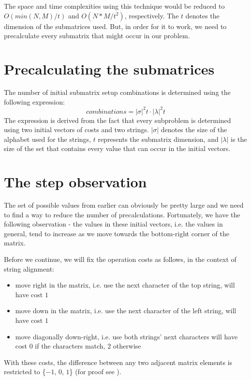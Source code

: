 \documentclass[times, utf8, seminar, numeric]{fer}
\begin{document}
The space and time complexities using this technique would be reduced to \\
$O(min(N, M) / t)$ and $O(N * M / t^2)$, respectively. The $t$ denotes the dimension of the submatrices used. But, in order for it to work, we need to precalculate every submatrix that might occur in our problem.

\section{Precalculating the submatrices}
The number of initial submatrix setup combinations is determined using the following expression:
\begin{equation}
  combinations = |\sigma|^2t \cdot |\lambda|^2t
\end{equation}
The expression is derived from the fact that every subproblem is determined using two initial vectors of costs and two strings. $|\sigma|$ denotes the size of the alphabet used for the strings, $t$ represents the submatrix dimension, and $|\lambda|$ is the size of the set that contains every value that can occur in the initial vectors.

\section{The step observation}
The set of possible values from earlier can obviously be pretty large and we need to find a way to reduce the number of precalculations. Fortunately, we have the following observation - the values in these initial vectors, i.e. the values in general, tend to increase as we move towards the bottom-right corner of the matrix.

Before we continue, we will fix the operation costs as follows, in the context of string alignment:
\begin{itemize}
\item move right in the matrix, i.e. use the next character of the top string, will have cost $1$
\item move down in the matrix, i.e. use the next character of the left string, will have cost $1$
\item move diagonally down-right, i.e. use both strings' next characters will have cost $0$ if the characters match, $2$ otherwise
\end{itemize}
With these costs, the difference between any two adjacent matrix elements is restricted to \{$-1$, $0$, $1$\} (for proof see \citep{gusfield1997algorithms}).
\end{document}
